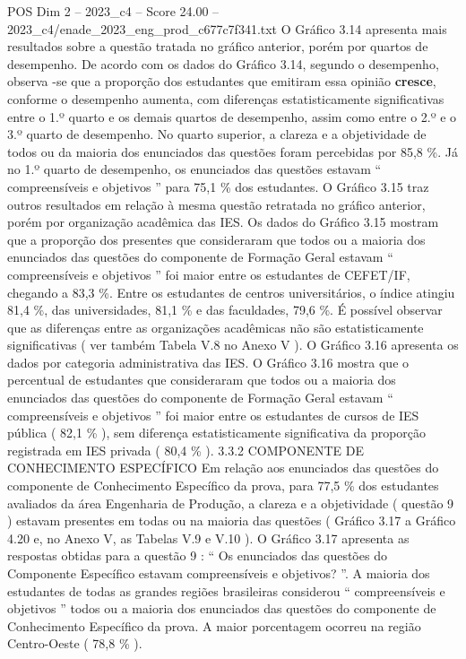 \begin{textsample}{POS Dim 2 – 2023\_c4 – Score 24.00 – 2023\_c4/enade\_2023\_eng\_prod\_c677c7f341.txt}
O Gráfico 3.14 apresenta mais resultados sobre a questão tratada no gráfico anterior, porém por quartos de desempenho.
De acordo com os dados do Gráfico 3.14, segundo o desempenho, observa -se que a proporção dos estudantes que emitiram essa opinião \textbf{cresce}, conforme o desempenho aumenta, com diferenças estatisticamente significativas entre o 1.º quarto e os demais quartos de desempenho, assim como entre o 2.º e o 3.º quarto de desempenho.
No quarto superior, a clareza e a objetividade de todos ou da maioria dos enunciados das questões foram percebidas por 85,8 \%.
Já no 1.º quarto de desempenho, os enunciados das questões estavam “ compreensíveis e objetivos ” para 75,1 \% dos estudantes.
O Gráfico 3.15 traz outros resultados em relação à mesma questão retratada no gráfico anterior, porém por organização acadêmica das IES.
Os dados do Gráfico 3.15 mostram que a proporção dos presentes que consideraram que todos ou a maioria dos enunciados das questões do componente de Formação Geral estavam “ compreensíveis e objetivos ” foi maior entre os estudantes de CEFET/IF, chegando a 83,3 \%.
Entre os estudantes de centros universitários, o índice atingiu 81,4 \%, das universidades, 81,1 \% e das faculdades, 79,6 \%.
É possível observar que as diferenças entre as organizações acadêmicas não são estatisticamente significativas ( ver também Tabela V.8 no Anexo V ).
O Gráfico 3.16 apresenta os dados por categoria administrativa das IES.
O Gráfico 3.16 mostra que o percentual de estudantes que consideraram que todos ou a maioria dos enunciados das questões do componente de Formação Geral estavam “ compreensíveis e objetivos ” foi maior entre os estudantes de cursos de IES pública ( 82,1 \% ), sem diferença estatisticamente significativa da proporção registrada em IES privada ( 80,4 \% ). 3.3.2 COMPONENTE DE CONHECIMENTO ESPECÍFICO Em relação aos enunciados das questões do componente de Conhecimento Específico da prova, para 77,5 \% dos estudantes avaliados da área Engenharia de Produção, a clareza e a objetividade ( questão 9 ) estavam presentes em todas ou na maioria das questões ( Gráfico 3.17 a Gráfico 4.20 e, no Anexo V, as Tabelas V.9 e V.10 ).
O Gráfico 3.17 apresenta as respostas obtidas para a questão 9 : “ Os enunciados das questões do Componente Específico estavam compreensíveis e objetivos? ”.
A maioria dos estudantes de todas as grandes regiões brasileiras considerou “ compreensíveis e objetivos ” todos ou a maioria dos enunciados das questões do componente de Conhecimento Específico da prova.
A maior porcentagem ocorreu na região Centro-Oeste ( 78,8 \% ).

\end{textsample}
